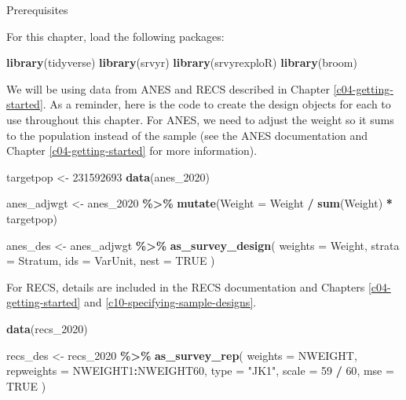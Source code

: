 \documentclass[
]{krantz}
\makeatletter
\newenvironment{Shaded}{\begin{snugshade}}{\end{snugshade}}
\newcommand{\AttributeTok}[1]{\textcolor[rgb]{0.27,0.27,0.27}{#1}}
\newcommand{\ConstantTok}[1]{\textcolor[rgb]{0.37,0.37,0.37}{#1}}
\newcommand{\DecValTok}[1]{\textcolor[rgb]{0.06,0.06,0.06}{#1}}
\newcommand{\FunctionTok}[1]{\textcolor[rgb]{0.27,0.27,0.27}{\textbf{#1}}}
\newcommand{\NormalTok}[1]{#1}
\newcommand{\OtherTok}[1]{\textcolor[rgb]{0.37,0.37,0.37}{#1}}
\newcommand{\SpecialCharTok}[1]{\textcolor[rgb]{0.43,0.43,0.43}{\textbf{#1}}}
\newcommand{\StringTok}[1]{\textcolor[rgb]{0.5,0.5,0.5}{#1}}
\newenvironment{kframe}{%
\medskip{}
\setlength{\fboxsep}{.8em}
 \def\at@end@of@kframe{}%
 \ifinner\ifhmode%
  \def\at@end@of@kframe{\end{minipage}}%
  \begin{minipage}{\columnwidth}%
 \fi\fi%
 \def\FrameCommand##1{\hskip\@totalleftmargin \hskip-\fboxsep
 \colorbox{shadecolor}{##1}\hskip-\fboxsep
     \hskip-\linewidth \hskip-\@totalleftmargin \hskip\columnwidth}%
 \MakeFramed {\advance\hsize-\width
   \@totalleftmargin\z@ \linewidth\hsize
   \@setminipage}}%
 {\par\unskip\endMakeFramed%
 \at@end@of@kframe}
\renewenvironment{Shaded}{\begin{kframe}}{\end{kframe}}
\makeatother
\begin{document}
\begin{prereqbox}{Prerequisites}

For this chapter, load the following packages:

\begin{Shaded}
\begin{Highlighting}[]
\FunctionTok{library}\NormalTok{(tidyverse)}
\FunctionTok{library}\NormalTok{(srvyr)}
\FunctionTok{library}\NormalTok{(srvyrexploR)}
\FunctionTok{library}\NormalTok{(broom)}
\end{Highlighting}
\end{Shaded}

We will be using data from ANES and RECS described in Chapter \ref{c04-getting-started}. As a reminder, here is the code to create the design objects for each to use throughout this chapter. For ANES, we need to adjust the weight so it sums to the population instead of the sample (see the ANES documentation and Chapter \ref{c04-getting-started} for more information).

\begin{Shaded}
\begin{Highlighting}[]
\NormalTok{targetpop }\OtherTok{\textless{}{-}} \DecValTok{231592693}
\FunctionTok{data}\NormalTok{(anes\_2020)}

\NormalTok{anes\_adjwgt }\OtherTok{\textless{}{-}}\NormalTok{ anes\_2020 }\SpecialCharTok{\%\textgreater{}\%}
  \FunctionTok{mutate}\NormalTok{(}\AttributeTok{Weight =}\NormalTok{ Weight }\SpecialCharTok{/} \FunctionTok{sum}\NormalTok{(Weight) }\SpecialCharTok{*}\NormalTok{ targetpop)}

\NormalTok{anes\_des }\OtherTok{\textless{}{-}}\NormalTok{ anes\_adjwgt }\SpecialCharTok{\%\textgreater{}\%}
  \FunctionTok{as\_survey\_design}\NormalTok{(}
    \AttributeTok{weights =}\NormalTok{ Weight,}
    \AttributeTok{strata =}\NormalTok{ Stratum,}
    \AttributeTok{ids =}\NormalTok{ VarUnit,}
    \AttributeTok{nest =} \ConstantTok{TRUE}
\NormalTok{  )}
\end{Highlighting}
\end{Shaded}

For RECS, details are included in the RECS documentation and Chapters \ref{c04-getting-started} and \ref{c10-specifying-sample-designs}.

\begin{Shaded}
\begin{Highlighting}[]
\FunctionTok{data}\NormalTok{(recs\_2020)}

\NormalTok{recs\_des }\OtherTok{\textless{}{-}}\NormalTok{ recs\_2020 }\SpecialCharTok{\%\textgreater{}\%}
  \FunctionTok{as\_survey\_rep}\NormalTok{(}
    \AttributeTok{weights =}\NormalTok{ NWEIGHT,}
    \AttributeTok{repweights =}\NormalTok{ NWEIGHT1}\SpecialCharTok{:}\NormalTok{NWEIGHT60,}
    \AttributeTok{type =} \StringTok{"JK1"}\NormalTok{,}
    \AttributeTok{scale =} \DecValTok{59} \SpecialCharTok{/} \DecValTok{60}\NormalTok{,}
    \AttributeTok{mse =} \ConstantTok{TRUE}
\NormalTok{  )}
\end{Highlighting}
\end{Shaded}

\end{prereqbox}
\end{document}
